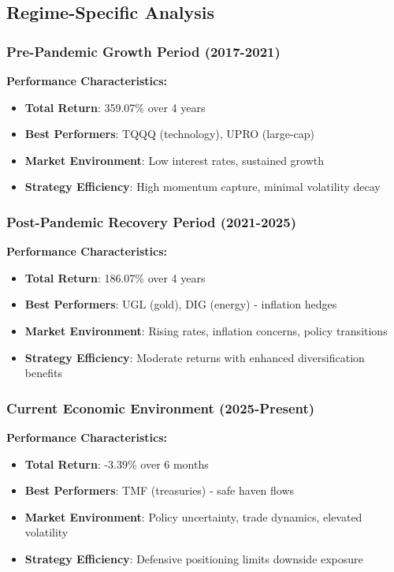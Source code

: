 \documentclass[onecolumn,ieee]{arithmaxresearch}
\begin{document}
\subsection{Regime-Specific Analysis}

\subsubsection{Pre-Pandemic Growth Period (2017-2021)}
\textbf{Performance Characteristics:}
\begin{itemize}
    \item \textbf{Total Return}: 359.07\% over 4 years
    \item \textbf{Best Performers}: TQQQ (technology), UPRO (large-cap)
    \item \textbf{Market Environment}: Low interest rates, sustained growth
    \item \textbf{Strategy Efficiency}: High momentum capture, minimal volatility decay
\end{itemize}

\subsubsection{Post-Pandemic Recovery Period (2021-2025)}
\textbf{Performance Characteristics:}
\begin{itemize}
    \item \textbf{Total Return}: 186.07\% over 4 years
    \item \textbf{Best Performers}: UGL (gold), DIG (energy) - inflation hedges
    \item \textbf{Market Environment}: Rising rates, inflation concerns, policy transitions
    \item \textbf{Strategy Efficiency}: Moderate returns with enhanced diversification benefits
\end{itemize}

\subsubsection{Current Economic Environment (2025-Present)}
\textbf{Performance Characteristics:}
\begin{itemize}
    \item \textbf{Total Return}: -3.39\% over 6 months
    \item \textbf{Best Performers}: TMF (treasuries) - safe haven flows
    \item \textbf{Market Environment}: Policy uncertainty, trade dynamics, elevated volatility
    \item \textbf{Strategy Efficiency}: Defensive positioning limits downside exposure
\end{itemize}
\end{document}
